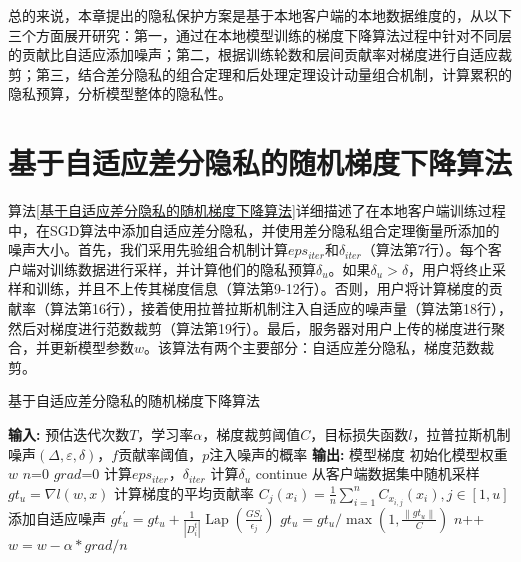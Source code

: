 总的来说，本章提出的隐私保护方案是基于本地客户端的本地数据维度的，从以下三个方面展开研究：第一，通过在本地模型训练的梯度下降算法过程中针对不同层的贡献比自适应添加噪声；第二，根据训练轮数和层间贡献率对梯度进行自适应裁剪；第三，结合差分隐私的组合定理和后处理定理设计动量组合机制，计算累积的隐私预算，分析模型整体的隐私性。

\section{基于自适应差分隐私的随机梯度下降算法}

算法\ref{基于自适应差分隐私的随机梯度下降算法}详细描述了在本地客户端训练过程中，在SGD算法中添加自适应差分隐私，并使用差分隐私组合定理衡量所添加的噪声大小。首先，我们采用先验组合机制计算$eps_{iter}$和$\delta_{iter}$（算法第7行）。每个客户端对训练数据进行采样，并计算他们的隐私预算$\delta_{u}$。如果$\delta_{u}>\delta$，用户将终止采样和训练，并且不上传其梯度信息（算法第9-12行）。否则，用户将计算梯度的贡献率（算法第16行），接着使用拉普拉斯机制注入自适应的噪声量（算法第18行），然后对梯度进行范数裁剪（算法第19行）。最后，服务器对用户上传的梯度进行聚合，并更新模型参数$w$。该算法有两个主要部分：自适应差分隐私，梯度范数裁剪。

\begin{algorithm}[!htb]
	\caption{基于自适应差分隐私的随机梯度下降算法}
	\label{基于自适应差分隐私的随机梯度下降算法}
	\begin{algorithmic}[1]
		\footnotesize
		\STATE \textbf{输入:} 预估迭代次数$T$，学习率$\alpha$，梯度裁剪阈值$C$，目标损失函数$l$，拉普拉斯机制噪声$(\Delta, \varepsilon, \delta)$，$f$贡献率阈值，$p$注入噪声的概率
		\STATE \textbf{输出:} 模型梯度
		\STATE 初始化模型权重$w$
			\STATE $n$=0
			\STATE $grad$=0
			\STATE 计算$eps_{iter}$，$\delta_{iter}$
				\STATE 计算$\delta_{u}$
					\STATE continue
				\ENDIF
				\STATE 从客户端数据集中随机采样
				\STATE $g t_{u}=\nabla l(w, x)$
				\STATE 计算梯度的平均贡献率
				\STATE $C_{j}\left(x_{i}\right)=\frac{1}{n} \sum_{i=1}^{n} C_{x_{i, j}}\left(x_{i}\right), j \in[1, u]$
				\STATE 添加自适应噪声
				\STATE $g t_{u}^{\prime}=g t_{u}+\frac{1}{\left|D_{i}^{t}\right|} \operatorname{Lap}\left(\frac{G S_{l}}{\epsilon_{j}}\right)$
				\STATE $g t_{u}=g t_{u} / \max \left(1, \frac{\left\|g t_{u}\right\|}{C}\right)$
				\STATE $n$++
			\ENDFOR
			\STATE $w=w-\alpha * g r a d / n$
		\ENDWHILE
	\end{algorithmic}
\end{algorithm}

